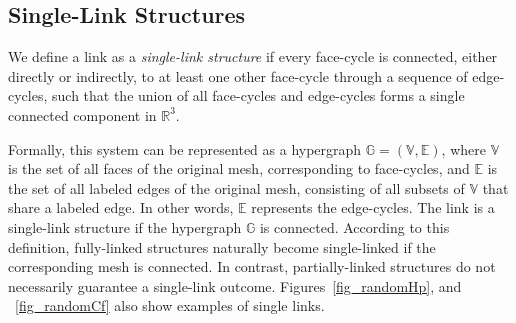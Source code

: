 \documentclass[times,twocolumn,final]{elsarticle}
\begin{document}
\subsection{Single-Link Structures}

We define a link as a \textit{single-link structure} if every face-cycle is connected, either directly or indirectly, to at least one other face-cycle through a sequence of edge-cycles, such that the union of all face-cycles and edge-cycles forms a single connected component in $\mathbb{R}^3$.

Formally, this system can be represented as a hypergraph $\mathbb{G} = (\mathbb{V}, \mathbb{E})$, where $\mathbb{V}$ is the set of all faces of the original mesh, corresponding to face-cycles, and $\mathbb{E}$ is the set of all labeled edges of the original mesh, consisting of all subsets of $\mathbb{V}$ that share a labeled edge. In other words, $\mathbb{E}$ represents the edge-cycles. The link is a single-link structure if the hypergraph $\mathbb{G}$ is connected. According to this definition, fully-linked structures naturally become single-linked if the corresponding mesh is connected. In contrast, partially-linked structures do not necessarily guarantee a single-link outcome.
Figures~\ref{fig_randomHp}, and ~\ref{fig_randomCf} also show examples of single links. 


    
\end{document}
